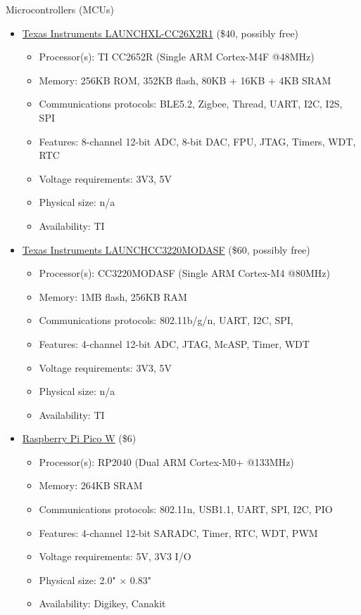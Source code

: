 \begin{flushleft}
    Microcontrollers (MCUs)
    \begin{itemize}
        \item
        \href{https://www.ti.com/tool/LAUNCHXL-CC26X2R1}{Texas Instruments LAUNCHXL-CC26X2R1} (\$40,
        possibly free)
        \begin{itemize}
            \item Processor(s): TI CC2652R (Single ARM Cortex-M4F @48MHz)
            \item Memory: 256KB ROM, 352KB flash, 80KB + 16KB + 4KB SRAM
            \item Communications protocols: BLE5.2, Zigbee, Thread, UART, I2C, I2S, SPI
            \item Features: 8-channel 12-bit ADC, 8-bit DAC, FPU, JTAG, Timers, WDT, RTC
            \item Voltage requirements: 3V3, 5V
            \item Physical size: n/a
            \item Availability: TI
        \end{itemize}

        \item
        \href{https://www.ti.com/tool/LAUNCHCC3220MODASF}{Texas Instruments LAUNCHCC3220MODASF} (\$60,
        possibly free)
        \begin{itemize}
            \item Processor(s): CC3220MODASF (Single ARM Cortex-M4 @80MHz)
            \item Memory: 1MB flash, 256KB RAM
            \item Communications protocols: 802.11b/g/n, UART, I2C, SPI,
            \item Features: 4-channel 12-bit ADC, JTAG, McASP, Timer, WDT
            \item Voltage requirements: 3V3, 5V
            \item Physical size: n/a
            \item Availability: TI
        \end{itemize}

        \item
        \href{https://www.raspberrypi.com/products/raspberry-pi-pico/}{Raspberry Pi Pico W} (\$6)
        \begin{itemize}
            \item Processor(s): RP2040 (Dual ARM Cortex-M0+ @133MHz)
            \item Memory: 264KB SRAM
            \item Communications protocols: 802.11n, USB1.1, UART, SPI, I2C, PIO
            \item Features: 4-channel 12-bit SARADC, Timer, RTC, WDT, PWM
            \item Voltage requirements: 5V, 3V3 I/O
            \item Physical size: 2.0" $\times$ 0.83"
            \item Availability: Digikey, Canakit
        \end{itemize}


\end{itemize}
\end{flushleft}
